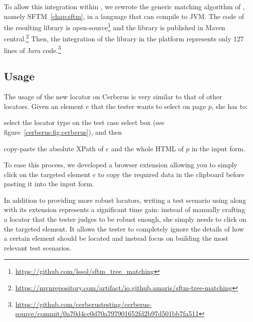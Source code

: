 
To allow this integration within \cerberus, we rewrote the generic matching algorithm of \erratum, namely SFTM~\ref{chap:sftm}, in a language that can compile to JVM.
The code of the resulting library is open-source\footnote{\url{https://github.com/lssol/sftm\_tree\_matching}} and the library is published in Maven central.\footnote{\url{https://mvnrepository.com/artifact/io.github.amaris/sftm-tree-matching}}
Then, the integration of the \erratum library in the \cerberus platform represents only 127 lines of Java code.\footnote{\url{https://github.com/cerberustesting/cerberus-source/commit/0a70d4cc0d70a797901652fd2b97d501bb7fa511}}

\subsection{Usage}
The usage of the new \erratum locator on Cerberus is very similar to that of other locators.
Given an element $e$ that the tester wants to select on page $p$, she has to:
\begin{compactenum}
\item select the \erratum locator type on the test case select box (see figure~\ref{cerberus:fig:cerberus}), and then
\item copy-paste the absolute XPath of $e$ and the whole HTML of $p$ in the input form.
\end{compactenum}
To ease this process, we developed a browser extension allowing you to simply click on the targeted element $e$ to copy the required data in the clipboard before pasting it into the input form.

In addition to providing more robust locators, writing a test scenario using \erratum along with its extension represents a significant time gain: instead of manually crafting a locator that the tester judges to be robust enough, she simply needs to click on the targeted element. 
It allows the tester to completely ignore the details of how a certain element should be located and instead focus on building the most relevant test scenarios.

